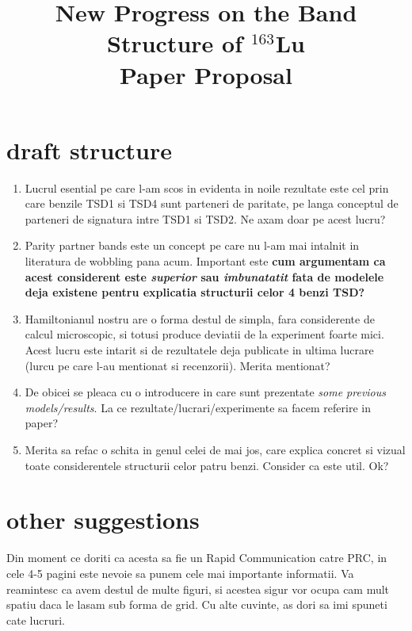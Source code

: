 \documentclass[%
 preprint,
 amsmath,
 amssymb,
 aps,
]{revtex4-2}
\begin{document}
\title{New Progress on the Band Structure of $^{163}$Lu \\Paper Proposal}
\maketitle
\section{draft structure}
\begin{enumerate}
    \item Lucrul esential pe care l-am scos in evidenta in noile rezultate este cel prin care benzile TSD1 si TSD4 sunt parteneri de paritate, pe langa conceptul de parteneri de signatura intre TSD1 si TSD2. Ne axam doar pe acest lucru?
    \item Parity partner bands este un concept pe care nu l-am mai intalnit in literatura de wobbling pana acum. Important este \textbf{cum argumentam ca acest considerent este \emph{superior} sau \emph{imbunatatit} fata de modelele deja existene pentru explicatia structurii celor 4 benzi TSD?}
    \item Hamiltonianul nostru are o forma destul de simpla, fara considerente de calcul microscopic, si totusi produce deviatii de la experiment foarte mici. Acest lucru este intarit si de rezultatele deja publicate in ultima lucrare (lurcu pe care l-au mentionat si recenzorii). Merita mentionat?
    \item De obicei se pleaca cu o introducere in care sunt prezentate \emph{some previous models/results}. La ce rezultate/lucrari/experimente sa facem referire in paper? 
    \item Merita sa refac o schita in genul celei de mai jos, care explica concret si vizual toate considerentele structurii celor patru benzi. Consider ca este util. Ok?
\end{enumerate}

\section{other suggestions}

\par Din moment ce doriti ca acesta sa fie un Rapid Communication catre PRC, in cele 4-5 pagini este nevoie sa punem cele mai importante informatii. Va reamintesc ca avem destul de multe figuri, si acestea sigur vor ocupa cam mult spatiu daca le lasam sub forma de grid. Cu alte cuvinte, as dori sa imi spuneti cate lucruri.
\end{document}
